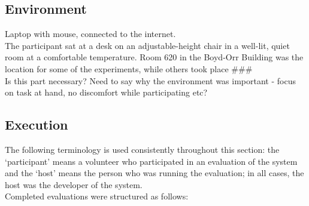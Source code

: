 \documentclass{l4proj}
\newcommand{\revisit}{\#\#\#}
\begin{document}
\subsection{Environment}
Laptop with mouse, connected to the internet.\\
The participant sat at a desk on an adjustable-height chair in a well-lit, quiet room at a comfortable temperature.	Room 620 in the Boyd-Orr Building was the location for some of the experiments, while others took place \revisit \\
Is this part necessary? Need to say why the environment was important - focus on task at hand, no discomfort while participating etc?

\subsection{Execution}
The following terminology is used consistently throughout this section: the `participant' means a volunteer who participated in an evaluation of the system and the `host' means the person who was running the evaluation; in all cases, the host was the developer of the system.\\
Completed evaluations were structured as follows:
\end{document}
